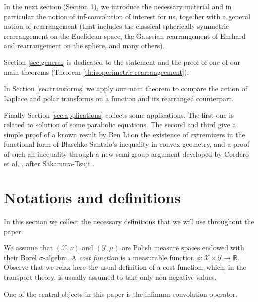 \documentclass[11pt]{article}
\newcommand{\1}{[1]}
\begin{document}
\medskip

In the next section (Section \ref{sec:notations-definitions}), we introduce the necessary material and in particular the notion of inf-convolution of interest for us, together with a general notion of rearrangement (that includes the classical spherically symmetric rearrangement on the Euclidean space, the Gaussian rearrangement of Ehrhard and rearrangement on the sphere, and many others).

\smallskip

Section \ref{sec:general} is dedicated to the statement and the proof of one of our main theorems (Theorem \ref{th:isoperimetric-rearrangeement}).

\smallskip

In Section  \ref{sec:transforms} we apply our main theorem to compare the action of Laplace and polar transforms on a function and its rearranged counterpart.

\smallskip

Finally Section \ref{sec:applications} collects some applications. The first one is related to solution of some parabolic equations. The second and third give a simple proof of a known result by Ben Li \cite{li} on the existence of extremizers in the functional form of Blaschke-Santalo's inequality \cite{ball86,artstein-klartag-milman,fradelizi-meyer,lehec} in convex geometry, and a proof of such an inequality through a new semi-group argument developed by Cordero et al. \cite{cordero,CFL}, after Sakamura-Tsuji \cite{nakamura}.



\section{Notations and definitions}
\label{sec:notations-definitions}

In this section we collect the necessary definitions that we will use throughout the paper. 

We assume that $(\mathcal{X},\nu)$ and $(\mathcal{Y}, \mu)$ are Polish measure spaces endowed with their Borel $\sigma$-algebra. A \emph{cost function} is a measurable function $\phi \colon \mathcal{X} \times \mathcal{Y} \to \mathbb{R}$. Observe that we relax here the usual definition of a cost function, which, in the transport theory, is usually assumed to take only non-negative values.

One of the central objects in this paper is the infimum convolution operator.
\end{document}
